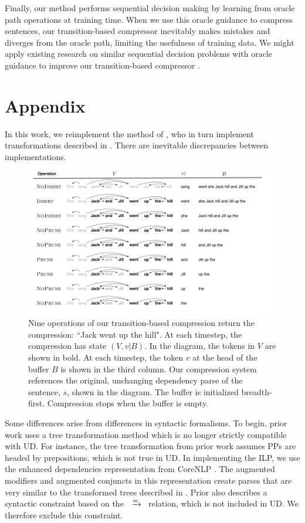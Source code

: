 \documentclass[11pt,a4paper]{article}
\newcommand{\rdep}[1]{\ $\xrightarrow{\text{\tiny #1}}$\ }
\begin{document}
Finally, our method performs sequential decision making by learning from oracle path operations at training time. When we use this oracle guidance to compress sentences, our transition-based compressor inevitably makes mistakes and diverges from the oracle path, limiting the usefulness of training data. We might apply existing research on similar sequential decision problems with oracle guidance to improve our transition-based compressor \cite{Ross2011ARO}. 

\section{Appendix}

In this work, we reimplement the method of \citet{filippova2013overcoming}, who in turn implement transformations described in \citet{filippova2008dependency}. There are inevitable discrepancies between implementations. 

\begin{figure}[htb!]
\centering
\includegraphics[width=.75\textwidth]{worked.pdf}
\caption{Nine operations of our transition-based compression return the compression: ``Jack went up the hill". At each timestep, the compression has state $(V, v|B)$. In the diagram, the tokens in $V$ are shown in bold. At each timestep, the token $v$ at the head of the buffer $B$ is shown in the third column. Our compression system references the original, unchanging dependency parse of the sentence, $s$, shown in the diagram. The buffer is initialized breadth-first. Compression stops when the buffer is empty.}
\label{f:example}
\end{figure}

Some differences arise from differences in syntactic formalisms. To begin, prior work uses a tree transformation method which is no longer strictly compatible with UD. For instance, the tree transformation from prior work assumes PPs are headed by prepositions, which is not true in UD. In implementing the ILP, we use the enhanced dependencies representation from CoreNLP \cite{Schuster2016EnhancedEU}. The augmented modifiers and augmented conjuncts in this representation create parses that are very similar to the transformed trees described in \citet{filippova2008dependency}. Prior also describes a syntactic constraint based on the \rdep{sc} relation, which is not included in UD. We therefore exclude this constraint.
\end{document}
